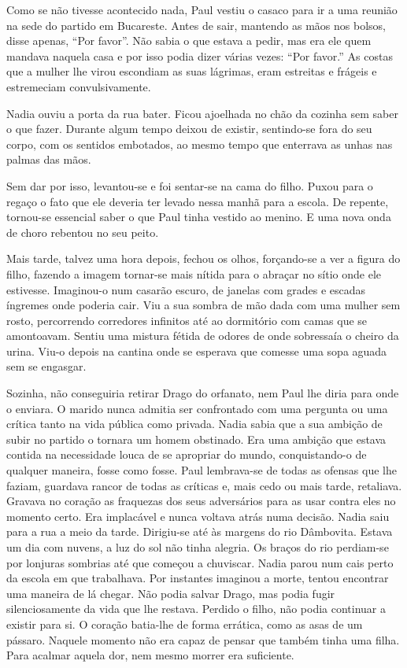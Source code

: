 Como se não tivesse acontecido nada, Paul vestiu o casaco para ir a uma
reunião na sede do partido em Bucareste. Antes de sair, mantendo as
mãos nos bolsos, disse apenas, ``Por favor''. Não sabia o que estava a
pedir, mas era ele quem mandava naquela casa e por isso podia dizer
várias vezes: ``Por favor.'' As costas que a mulher lhe virou escondiam as
suas lágrimas, eram estreitas e frágeis e estremeciam convulsivamente.

Nadia ouviu a porta da rua bater. Ficou ajoelhada no chão da cozinha sem
saber o que fazer. Durante algum tempo deixou de existir, sentindo-se
fora do seu corpo, com os sentidos embotados, ao mesmo tempo que enterrava as unhas nas palmas das mãos.

Sem dar por isso, levantou-se e foi sentar-se na cama do filho. Puxou
para o regaço o fato que ele deveria ter levado nessa manhã para a
escola. De repente, tornou-se essencial saber o que Paul tinha vestido
ao menino. E uma nova onda de choro rebentou no seu peito.

Mais tarde, talvez uma hora depois, fechou os olhos, forçando-se a ver a
figura do filho, fazendo a imagem tornar-se mais nítida para o abraçar
no sítio onde ele estivesse. Imaginou-o num casarão escuro, de janelas
com grades e escadas íngremes onde poderia cair. Viu a sua sombra de mão
dada com uma mulher sem rosto, percorrendo corredores infinitos até ao
dormitório com camas que se amontoavam. Sentiu uma mistura fétida de
odores de onde sobressaía o cheiro da urina. Viu-o depois na cantina
onde se esperava que comesse uma sopa aguada sem se engasgar.

Sozinha, não conseguiria retirar Drago do orfanato, nem Paul lhe diria
para onde o enviara. O marido nunca admitia ser confrontado com uma
pergunta ou uma crítica tanto na vida pública como privada. Nadia sabia
que a sua ambição de subir no partido o tornara um homem obstinado. Era
uma ambição que estava contida na necessidade louca de se apropriar do
mundo, conquistando-o de qualquer maneira, fosse como fosse. Paul
lembrava-se de todas as ofensas que lhe faziam, guardava rancor de todas
as críticas e, mais cedo ou mais tarde, retaliava. Gravava no coração as
fraquezas dos seus adversários para as usar contra eles no momento
certo. Era implacável e nunca voltava atrás numa decisão. Nadia saiu
para a rua a meio da tarde. Dirigiu-se até às margens do rio Dâmbovita.
Estava um dia com nuvens, a
luz do sol não tinha alegria. Os braços do rio perdiam-se por lonjuras
sombrias até que começou a chuviscar. Nadia parou num cais perto da
escola em que trabalhava. Por instantes imaginou a morte, tentou
encontrar uma maneira de lá chegar. Não podia salvar Drago, mas podia
fugir silenciosamente da vida que lhe restava. Perdido o filho, não
podia continuar a existir para si. O coração batia-lhe de forma
errática, como as asas de um pássaro. Naquele momento não era capaz de
pensar que também tinha uma filha. Para acalmar aquela dor, nem mesmo
morrer era suficiente.

